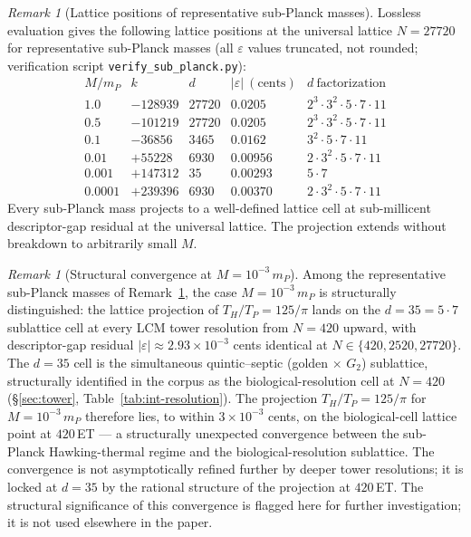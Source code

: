\documentclass[11pt,a4paper]{article}
\theoremstyle{definition}
\theoremstyle{remark}
\newtheorem{remark}[theorem]{Remark}
\begin{document}
\begin{remark}[Lattice positions of representative sub-Planck masses]\label{rem:subplanck-table}
Lossless evaluation gives the following lattice positions at the universal lattice $N = 27720$ for representative sub-Planck masses (all $\varepsilon$ values truncated, not rounded; verification script \texttt{verify\_sub\_planck.py}):
\[
\begin{array}{r|c|c|c|l}
M/m_{P} & k & d & |\varepsilon|~(\text{cents}) & d~\text{factorization}\\ \hline
1.0 & -128939 & 27720 & 0.0205 & 2^{3}\!\cdot\!3^{2}\!\cdot\!5\!\cdot\!7\!\cdot\!11 \\
0.5 & -101219 & 27720 & 0.0205 & 2^{3}\!\cdot\!3^{2}\!\cdot\!5\!\cdot\!7\!\cdot\!11 \\
0.1 & -36856 & 3465 & 0.0162 & 3^{2}\!\cdot\!5\!\cdot\!7\!\cdot\!11 \\
0.01 & +55228 & 6930 & 0.00956 & 2\!\cdot\!3^{2}\!\cdot\!5\!\cdot\!7\!\cdot\!11 \\
0.001 & +147312 & 35 & 0.00293 & 5\!\cdot\!7 \\
0.0001 & +239396 & 6930 & 0.00370 & 2\!\cdot\!3^{2}\!\cdot\!5\!\cdot\!7\!\cdot\!11
\end{array}
\]
Every sub-Planck mass projects to a well-defined lattice cell at sub-millicent descriptor-gap residual at the universal lattice. The projection extends without breakdown to arbitrarily small $M$.
\end{remark}

\begin{remark}[Structural convergence at $M = 10^{-3}\,m_{P}$]\label{rem:subplanck-convergence}
Among the representative sub-Planck masses of Remark~\ref{rem:subplanck-table}, the case $M = 10^{-3}\,m_{P}$ is structurally distinguished: the lattice projection of $T_{H}/T_{P} = 125/\pi$ lands on the $d = 35 = 5 \cdot 7$ sublattice cell at every LCM tower resolution from $N = 420$ upward, with descriptor-gap residual $|\varepsilon| \approx 2.93 \times 10^{-3}$ cents identical at $N \in \{420, 2520, 27720\}$. The $d = 35$ cell is the simultaneous quintic--septic (golden $\times$ $G_{2}$) sublattice, structurally identified in the corpus as the biological-resolution cell at $N = 420$ (\S\ref{sec:tower}, Table~\ref{tab:int-resolution}). The projection $T_{H}/T_{P} = 125/\pi$ for $M = 10^{-3}\,m_{P}$ therefore lies, to within $3 \times 10^{-3}$ cents, on the biological-cell lattice point at $420$\,ET --- a structurally unexpected convergence between the sub-Planck Hawking-thermal regime and the biological-resolution sublattice. The convergence is not asymptotically refined further by deeper tower resolutions; it is locked at $d = 35$ by the rational structure of the projection at $420$\,ET. The structural significance of this convergence is flagged here for further investigation; it is not used elsewhere in the paper.
\end{remark}
\end{document}
